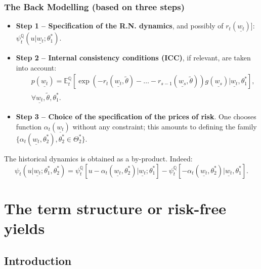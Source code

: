 \documentclass[
  12pt,
]{book}
\providecommand{\tightlist}{%
  \setlength{\itemsep}{0pt}\setlength{\parskip}{0pt}}
\theoremstyle{definition}
\theoremstyle{definition}
\theoremstyle{definition}
\theoremstyle{definition}
\theoremstyle{remark}
\begin{document}
\hypertarget{the-back-modelling-based-on-three-steps}{%
\subsection{The Back Modelling (based on three steps)}\label{the-back-modelling-based-on-three-steps}}

\begin{itemize}
\tightlist
\item
  \textbf{Step 1 -- Specification of the R.N. dynamics}, and possibly of \(r_{t}(\underline{w_t})\){]}: \(\psi^{\mathbb{Q}}_t (u | \underline{w_t}; \theta^*_1)\).
\item
  \textbf{Step 2 -- Internal consistency conditions (ICC)}, if relevant, are taken into account:
  \begin{equation*}
  \begin{array}{lll}
  && p(\underline{w_t}) = \mathbb{E}^{\mathbb{Q}}_t \left[ \exp (-r_{t} (\underline{w_t},\tilde{\theta}) - \dots - r_{s-1} (\underline{w_s}, \tilde{\theta}))g(\underline{w_s}) | \underline{w_t} , \theta^*_1\right] ,\\
  && \forall    \underline{w_t} , \tilde{\theta} , \theta^*_1.
  \end{array}
  \end{equation*}
\item
  \textbf{Step 3 -- Choice of the specification of the prices of risk}. One chooses function \(\alpha_t(\underline{w_t})\) without any constraint; this amounts to defining the family \(\{ \alpha_t (\underline{w_t}, \theta^*_2), \theta^*_2\in \Theta^*_2 \}\).
\end{itemize}

The historical dynamics is obtained as a by-product. Indeed:
\begin{equation*}
\psi_t(u | \underline{w_t} ; \theta^*_1, \theta^*_2) = \psi_t^{\mathbb{Q}}\left[ u -\alpha_t (\underline{w_t}, \theta^*_2)|\underline{w_t} ; \theta^*_1 \right] -\psi^{\mathbb{Q}}_t \left[- \alpha_t (\underline{w_t}, \theta^*_2) | \underline{w_t},\theta^*_1 \right].
\end{equation*}

\hypertarget{the-term-structure-or-risk-free-yields}{%
\chapter{The term structure or risk-free yields}\label{the-term-structure-or-risk-free-yields}}

\hypertarget{RFIntroduction}{%
\section{Introduction}\label{RFIntroduction}}
\end{document}
